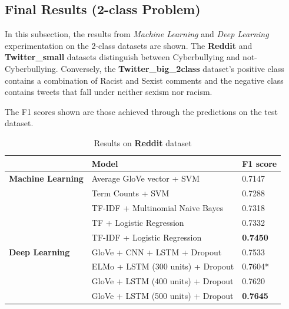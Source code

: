 \documentclass[12pt,a4paper]{article}
\begin{document}


\subsection{Final Results (2-class Problem)}
In this subsection, the results from \textit{Machine Learning} and \textit{Deep Learning} experimentation on the 2-class datasets are shown. The \textbf{Reddit} and \textbf{Twitter\_small} datasets distinguish between Cyberbullying and not-Cyberbullying. Conversely, the \textbf{Twitter\_big\_2class} dataset's positive class contains a combination of Racist and Sexist comments and the negative class contains tweets that fall under neither sexism nor racism. 

The F1 scores shown are those achieved through the predictions on the test dataset.

\begin{table}[H]
	\centering
	\vspace*{-18pt}
	\caption{Results on \textbf{Reddit} dataset}
	\label{results1}
	\hspace*{-0.8cm}
	\begin{tabular}{p{3.4cm} p{10cm} p{3cm}} \hline\hline
		& \textbf{Model} & \textbf{F1 score}  \\ \hline
		
		\textbf{Machine Learning} & Average GloVe vector + SVM & 0.7147 \\
		& Term Counts + SVM & 0.7288 \\
		& TF-IDF + Multinomial Naive Bayes & 0.7318 \\ 
		& TF + Logistic Regression & 0.7332 \\
		& TF-IDF + Logistic Regression & \textbf{0.7450} \\ \hline
		
		\textbf{Deep Learning} & GloVe + CNN + LSTM + Dropout & 0.7533 \\
		& ELMo + LSTM (300 units) + Dropout & 0.7604* \\
		& GloVe + LSTM (400 units) + Dropout & 0.7620 \\
		& GloVe + LSTM (500 units) + Dropout & \textbf{0.7645} \\ \hline
	\end{tabular}
\end{table}
\end{document}

